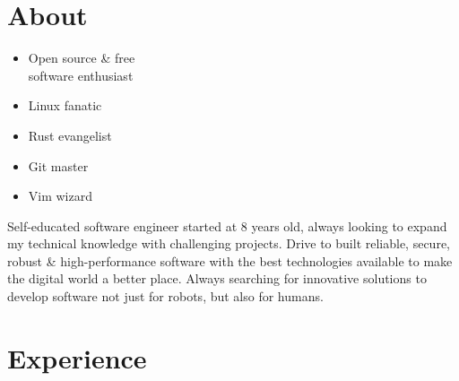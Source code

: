 \documentclass[]{cv-timvisee}
\providecommand{\tightlist}{%
\setlength{\itemsep}{0pt}\setlength{\parskip}{0pt}}
\begin{document}

\section{About}

{\setlength\multicolsep{3pt}%
\begin{multicols}{3}
\begin{itemize}
  \tightlist{}
  \item Open source \& free \\software enthusiast
  \item Linux fanatic
  \item Rust evangelist
  \item Git master
  \item Vim wizard
\end{itemize}
\end{multicols}}

Self-educated software engineer started at 8 years old, always looking to expand
my technical knowledge with challenging projects.
Drive to built reliable, secure, robust \& high-performance software with the
best technologies available to make the digital world a better place.
Always searching for innovative solutions to develop software not just for
robots, but also for humans.


\section{Experience}
\end{document}
